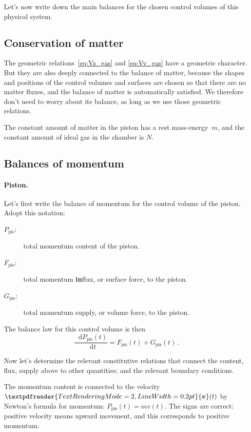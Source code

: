 \documentclass[a4paper,12pt,%
onecolumn,oneside,%
british%
]{memoir}
\renewcommand*{\bm}[1]{\textpdfrender{TextRenderingMode=2,LineWidth=0.2pt}{\boldsymbol{#1}}}
\newcommand*{\di}{\mathop{}\!\mathrm{d}}%
\renewcommand*{\|}[1][]{\nonscript\:#1\vert\nonscript\:\mathopen{}}
\newcommand*{\masse}{mass-energy}
\newcommand*{\yv}{\bm{v}}
\newcommand*{\dt}{\di t}
\newcommand*{\yN}{N}
\newcommand*{\ym}{m}%
\newcommand*{\yPpi}{P_{\textrm{pis}}}
\newcommand*{\yGpi}{G_{\textrm{pis}}}
\newcommand*{\yFpi}{F_{\textrm{pis}}}
\begin{document}
\medskip

Let's now write down the main balances for the chosen control volumes of this physical system.

\subsection{Conservation of matter}
\label{sec:idealgas_ex_matter}

The geometric relations~\eqref{eq:Vz_gas} and \eqref{eq:Vv_gas} have a geometric character. But they are also deeply connected to the balance of matter, because the shapes and positions of the control volumes and surfaces are chosen so that there are no matter fluxes, and the balance of matter is automatically satisfied. We therefore don't need to worry about its balance, as long as we use those geometric relations.

The constant amount of matter in the piston has a rest \masse\ $\ym$, and the constant amount of ideal gas in the chamber is $\yN$.

\subsection{Balances of momentum}
\label{sec:idealgas_ex_momentum}

\paragraph{Piston.}

Let's first write the balance of momentum for the control volume of the piston. Adopt this notation:
\begin{description}
\item[$\yPpi$:] total momentum content of the piston.
\item[$\yFpi$:] total momentum \textbf{in}flux, or surface force, to the piston.
\item[$\yGpi$:] total momentum supply, or volume force, to the piston.
\end{description}
The balance law for this control volume is then
\begin{equation*}
      \frac{\di \yPpi(t)}{\dt} = \yFpi(t) + \yGpi(t) \,.
\end{equation*}

Now let's determine the relevant constitutive relations that connect the content, flux, supply above to other quantities; and the relevant boundary conditions.

The momentum content is connected to the velocity $\yv(t)$ by Newton's formula for momentum: $\yPpi(t) = \ym v(t)$. The signs are correct: positive velocity means upward movement, and this corresponds to positive momentum.
\end{document}
